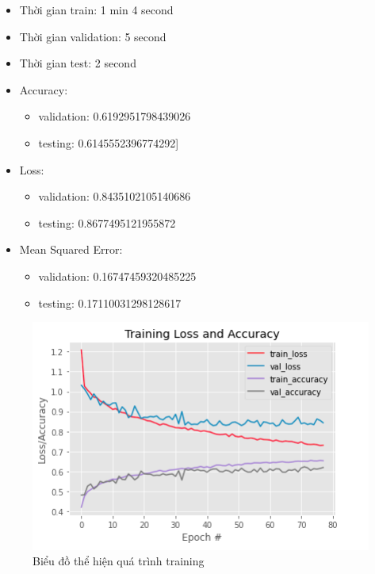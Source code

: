 \documentclass{article}
\begin{document}
\begin{itemize}
	\item Thời gian train: 1 min 4 second
	\item Thời gian validation: 5 second
	\item Thời gian test: 2 second
	\item Accuracy:
	      \begin{itemize}
		      \item validation: 0.6192951798439026
		      \item testing: 0.6145552396774292]
	      \end{itemize}
	\item Loss:
	      \begin{itemize}
		      \item validation: 0.8435102105140686
		      \item testing: 0.8677495121955872
	      \end{itemize}
	\item Mean Squared Error:
	      \begin{itemize}
		      \item validation: 0.16747459320485225
		      \item testing: 0.17110031298128617
	      \end{itemize}
\end{itemize}

\begin{figure}[H]
	\centering
	\includegraphics[width=6in]{images/loss_acc_model2_0.png}
	\caption{Biểu đồ thể hiện quá trình training}
\end{figure}
\end{document}

